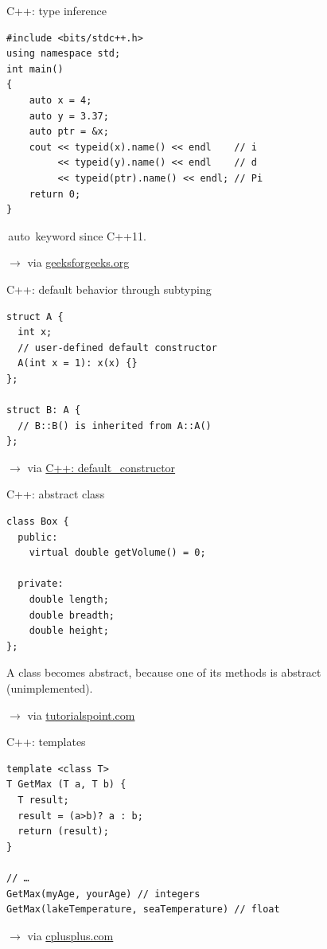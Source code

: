 \documentclass{beamer}
\newcommand\code[1]{\,{\color[HTML]{884400}#1}\,}
\newcommand\source[1]{$\rightarrow$ via #1}
\begin{document}
\begin{frame}[fragile]{C++: type inference}
  \begin{verbatim}
#include <bits/stdc++.h> 
using namespace std; 
int main() 
{ 
    auto x = 4; 
    auto y = 3.37; 
    auto ptr = &x; 
    cout << typeid(x).name() << endl    // i
         << typeid(y).name() << endl    // d
         << typeid(ptr).name() << endl; // Pi
    return 0; 
} 
  \end{verbatim}

  \code{auto} keyword since C++11.

  \source{\href{https://www.geeksforgeeks.org/type-inference-in-c-auto-and-decltype/}{geeksforgeeks.org}}
\end{frame}

\begin{frame}[fragile]{C++: default behavior through subtyping}
  \begin{verbatim}
struct A {
  int x;
  // user-defined default constructor
  A(int x = 1): x(x) {}
};
 
struct B: A {
  // B::B() is inherited from A::A()
};
  \end{verbatim}

  \source{\href{https://en.cppreference.com/w/cpp/language/default_constructor}{C++: default\_constructor}}
\end{frame}

\begin{frame}[fragile]{C++: abstract class}
  \begin{verbatim}
class Box {
  public:
    virtual double getVolume() = 0;
      
  private:
    double length;
    double breadth;
    double height;
};
  \end{verbatim}
  A class becomes abstract, because one of its methods is abstract (unimplemented).

  \source{\href{https://www.tutorialspoint.com/cplusplus/cpp_interfaces.htm}{tutorialspoint.com}}
\end{frame}

\begin{frame}[fragile]{C++: templates}
  \begin{verbatim}
template <class T>
T GetMax (T a, T b) {
  T result;
  result = (a>b)? a : b;
  return (result);
}

// …
GetMax(myAge, yourAge) // integers
GetMax(lakeTemperature, seaTemperature) // float
  \end{verbatim}
  \source{\href{http://www.cplusplus.com/doc/oldtutorial/templates/}{cplusplus.com}}
\end{frame}
\end{document}

